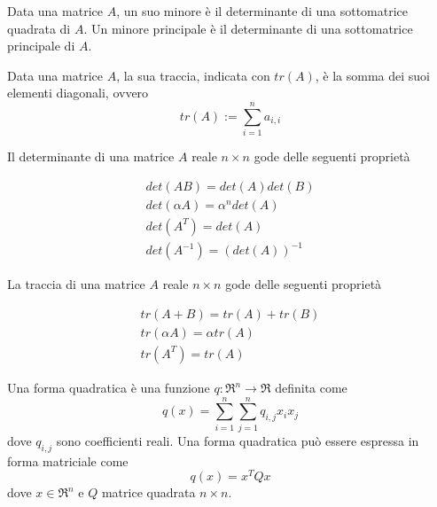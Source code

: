 \begin{definition}[Minore]
	\label{dfn:minor}
	Data una matrice $A$, un suo minore è il determinante di una sottomatrice quadrata di $A$.
	Un minore principale è il determinante di una sottomatrice principale  di $A$.
\end{definition}

\begin{definition}[Traccia]
	\label{dfn:trace}
	Data una matrice $A$, la sua traccia, indicata con $tr(A)$, è la somma dei suoi elementi diagonali, ovvero
	\begin{equation}
		\label{eqn:trace}
		tr(A):=\sum_{i=1}^{n}a_{i,i}
	\end{equation}
\end{definition}

Il determinante di una matrice $A$ reale $n\times n$ gode delle seguenti proprietà

\begin{eqnarray}
	\label{eqn:determinant-matrix-properties}
	det(AB)=det(A)det(B) \\
	det(\alpha A)=\alpha^{n}det(A) \\
	det(A^{T})=det(A) \\
	det(A^{-1})=(det(A))^{-1}
\end{eqnarray}

La traccia di una matrice $A$ reale $n\times n$ gode delle seguenti proprietà

\begin{eqnarray}
	\label{eqn:trace-matrix-properties}
	tr(A+B)=tr(A)+tr(B) \\
	tr(\alpha A)=\alpha tr(A) \\
	tr(A^{T})=tr(A)
\end{eqnarray}

\begin{definition}
	\label{dfn:quadratic-form}
	Una forma quadratica è una funzione $q:\Re^{n}\rightarrow\Re$ definita come
	\begin{equation}
		\label{eqn:quadratic-form-algebric}
		q(x)=\sum_{i=1}^{n}\sum_{j=1}^{n}q_{i,j}x_{i}x_{j}
	\end{equation}
	dove $q_{i,j}$ sono coefficienti reali.
	Una forma quadratica può essere espressa in forma matriciale come
	\begin{equation}
		\label{eqn:quadratic-form-matrix}
		q(x)=x^{T}Qx
	\end{equation}
	dove $x\in\Re^{n}$ e $Q$ matrice quadrata $n\times n$.
\end{definition}

